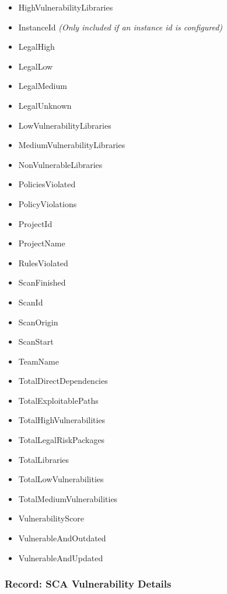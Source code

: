 \begin{itemize}

    \item HighVulnerabilityLibraries
    \item InstanceId \textit{(Only included if an instance id is configured)}
    \item LegalHigh
    \item LegalLow
    \item LegalMedium
    \item LegalUnknown
    \item LowVulnerabilityLibraries
    \item MediumVulnerabilityLibraries
    \item NonVulnerableLibraries
    \item PoliciesViolated
    \item PolicyViolations
    \item ProjectId
    \item ProjectName
    \item RulesViolated
    \item ScanFinished
    \item ScanId
    \item ScanOrigin
    \item ScanStart
    \item TeamName
    \item TotalDirectDependencies
    \item TotalExploitablePaths
    \item TotalHighVulnerabilities
    \item TotalLegalRiskPackages
    \item TotalLibraries
    \item TotalLowVulnerabilities
    \item TotalMediumVulnerabilities
    \item VulnerabilityScore
    \item VulnerableAndOutdated
    \item VulnerableAndUpdated
\end{itemize}


\subsubsection{Record: SCA Vulnerability Details}

